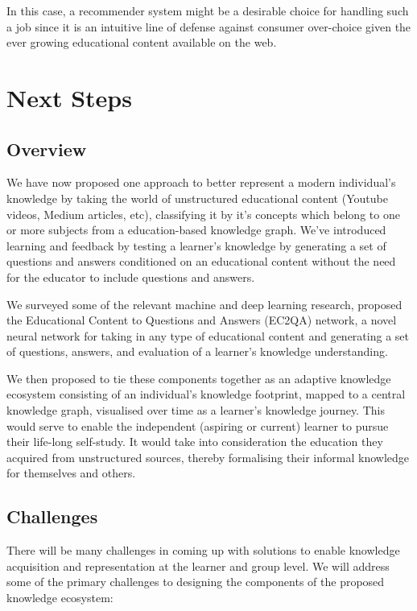 \documentclass{acm_proc_article-sp}
\begin{document}
In this case, a recommender system might be a desirable choice for
handling such a job since it is an intuitive line of defense against
consumer over-choice given the ever growing educational content
available on the web.

\section{Next Steps}\label{next-steps}

\subsection{Overview}\label{overview}

We have now proposed one approach to better represent a modern
individual's knowledge by taking the world of unstructured educational
content (Youtube videos, Medium articles, etc), classifying it by it's
concepts which belong to one or more subjects from a education-based
knowledge graph. We've introduced learning and feedback by testing a
learner's knowledge by generating a set of questions and answers
conditioned on an educational content without the need for the educator
to include questions and answers.

We surveyed some of the relevant machine and deep learning research,
proposed the Educational Content to Questions and Answers (EC2QA)
network, a novel neural network for taking in any type of educational
content and generating a set of questions, answers, and evaluation of a
learner's knowledge understanding.

We then proposed to tie these components together as an adaptive
knowledge ecosystem consisting of an individual's knowledge footprint,
mapped to a central knowledge graph, visualised over time as a learner's
knowledge journey. This would serve to enable the independent (aspiring
or current) learner to pursue their life-long self-study. It would take
into consideration the education they acquired from unstructured
sources, thereby formalising their informal knowledge for themselves and
others.

\subsection{Challenges}\label{challenges}

There will be many challenges in coming up with solutions to enable
knowledge acquisition and representation at the learner and group level.
We will address some of the primary challenges to designing the
components of the proposed knowledge ecosystem:
\end{document}
